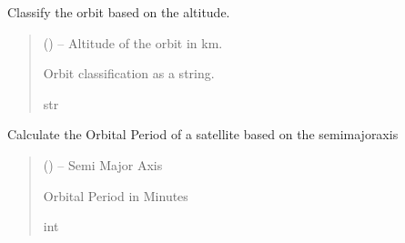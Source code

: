 \documentclass[letterpaper,10pt,english]{sphinxmanual}
\begin{document}

\begin{fulllineitems}
\label{\detokenize{fspsim.utils:fspsim.utils.Conversions.orbit_classify}}
\pysigstartsignatures
{}
\pysigstopsignatures
\sphinxAtStartPar
Classify the orbit based on the altitude.
\begin{quote}\begin{description}
\sphinxAtStartPar
{} () – Altitude of the orbit in km.

\sphinxAtStartPar
Orbit classification as a string.

\sphinxAtStartPar
str

\end{description}\end{quote}

\end{fulllineitems}


\begin{fulllineitems}
\label{\detokenize{fspsim.utils:fspsim.utils.Conversions.orbital_period}}
\pysigstartsignatures
{}
\pysigstopsignatures
\sphinxAtStartPar
Calculate the Orbital Period of a satellite based on the semi\sphinxhyphen{}major\sphinxhyphen{}axis
\begin{quote}\begin{description}
\sphinxAtStartPar
{} () – Semi Major Axis

\sphinxAtStartPar
Orbital Period in Minutes

\sphinxAtStartPar
int

\end{description}\end{quote}

\end{fulllineitems}
\end{document}
